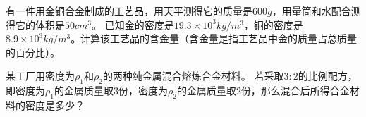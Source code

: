 \documentclass[a4paper,cs4size]{BHCexam}
\begin{document}
\begin{groups}
\begin{questions}[]
        \question[5] 有一件用金铜合金制成的工艺品，用天平测得它的质量是$600g$，用量筒和水配合测得它的体积是$50cm^3$。
        已知金的密度是$19.3\times 10^3 kg/m^3$，铜的密度是$8.9\times 10^3 kg/m^3$。计算该工艺品的含金量（含金量是指工艺品中金的质量占总质量的百分比）。
        \vspace{6.5cm}

        \question[5] 某工厂用密度为$\rho_1$和$\rho_2$的两种纯金属混合熔炼合金材料。
        若采取$3:2$的比例配方，即密度为$\rho_1$的金属质量取$3$份，密度为$\rho_2$的金属质量取$2$份，那么混合后所得合金材料的密度是多少？



    \end{questions}





\end{groups}


\label{lastpage}
\end{document}
